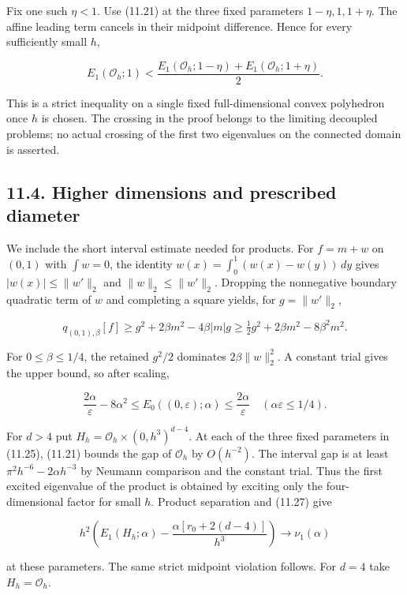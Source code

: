 \documentclass[11pt]{article}
\begin{document}
Fix one such \(\eta<1\). Use (11.21) at the three fixed parameters
\(1-\eta,1,1+\eta\). The affine leading term cancels in their midpoint
difference. Hence for every sufficiently small \(h\),

\[
E_1(\mathcal O_h;1)
<\frac{E_1(\mathcal O_h;1-\eta)+E_1(\mathcal O_h;1+\eta)}2.
\tag{11.25}
\]

This is a strict inequality on a single fixed full-dimensional convex
polyhedron once \(h\) is chosen. The crossing in the proof belongs to
the limiting decoupled problems; no actual crossing of the first two
eigenvalues on the connected domain is asserted.

\subsection{11.4. Higher dimensions and prescribed
diameter}\label{higher-dimensions-and-prescribed-diameter}

We include the short interval estimate needed for products. For
\(f=m+w\) on \((0,1)\) with \(\int w=0\), the identity
\(w(x)=\int_0^1(w(x)-w(y))\,dy\) gives \(|w(x)|\le\|w'\|_2\) and
\(\|w\|_2\le\|w'\|_2\). Dropping the nonnegative boundary quadratic term
of \(w\) and completing a square yields, for \(g=\|w'\|_2\),

\[
q_{(0,1),\beta}[f]\ge g^2+2\beta m^2-4\beta|m|g
\ge\tfrac12g^2+2\beta m^2-8\beta^2m^2.
\tag{11.26}
\]

For \(0\le\beta\le1/4\), the retained \(g^2/2\) dominates
\(2\beta\|w\|_2^2\). A constant trial gives the upper bound, so after
scaling,

\[
\frac{2\alpha}{\varepsilon}-8\alpha^2
\le E_0((0,\varepsilon);\alpha)
\le\frac{2\alpha}{\varepsilon}
\quad(\alpha\varepsilon\le1/4).
\tag{11.27}
\]

For \(d>4\) put \(H_h=\mathcal O_h\times(0,h^3)^{d-4}\). At each of the
three fixed parameters in (11.25), (11.21) bounds the gap of
\(\mathcal O_h\) by \(O(h^{-2})\). The interval gap is at least
\(\pi^2h^{-6}-2\alpha h^{-3}\) by Neumann comparison and the constant
trial. Thus the first excited eigenvalue of the product is obtained by
exciting only the four-dimensional factor for small \(h\). Product
separation and (11.27) give

\[
h^2\left(E_1(H_h;\alpha)
-\frac{\alpha[r_0+2(d-4)]}{h^3}\right)
\longrightarrow\nu_1(\alpha)
\tag{11.28}
\]

at these parameters. The same strict midpoint violation follows. For
\(d=4\) take \(H_h=\mathcal O_h\).
\end{document}
